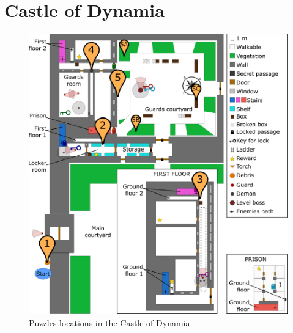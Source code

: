 \section{Castle of Dynamia}

\begin{figure}[H]
  \centering
  \includegraphics[width=\textwidth]{Images/Maps/castleOfDynamiaPuzzles}
  \caption{Puzzles locations in the Castle of Dynamia}
\end{figure}

%
%
%
%
%
%
%

